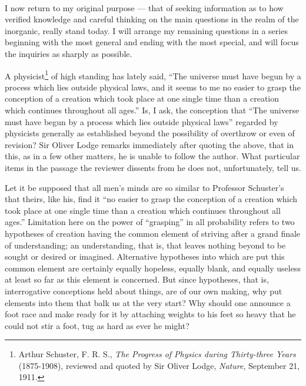 \documentclass[a4paper, 11pt, oneside, polutonikogreek, english]{article}
\begin{document}
\paragraph{}
I now return to my original purpose --- that of seeking information as to how verified knowledge and careful thinking on the main questions in the realm of the inorganic, really stand today. I will arrange my remaining questions in a series beginning with the most general and ending with the most special, and will focus the inquiries as sharply as possible.

A physicist\footnote{Arthur Schuster, F. R. S., \emph{The Progress of Physics during Thirty-three Years} (1875-1908), reviewed and quoted by Sir Oliver Lodge, \emph{Nature}, September 21, 1911.} of high standing has lately said, ``The universe must have begun by a process which lies outside physical laws, and it seems to me no easier to grasp the conception of a creation which took place at one single time than a creation which continues throughout all ages.'' Is, I ask, the conception that ``The universe must have begun by a process which lies outside physical laws'' regarded by physicists generally as established beyond the possibility of overthrow or even of revision? Sir Oliver Lodge remarks immediately after quoting the above, that in this, as in a few other matters, he is unable to follow the author. What particular items in the passage the reviewer dissents from he does not, unfortunately, tell us.

Let it be supposed that all men's minds are so similar to Professor Schuster's that theirs, like his, find it ``no easier to grasp the conception of a creation which took place at one single time than a creation which continues throughout all ages.'' Limitation here on the power of ``grasping'' in all probability refers to two hypotheses of creation having the common element of striving after a grand finale of understanding; an understanding, that is, that leaves nothing beyond to be sought or desired or imagined. Alternative hypotheses into which are put this common element are certainly equally hopeless, equally blank, and equally useless at least so far as this element is concerned. But since hypotheses, that is, interrogative conceptions held about things, are of our own making, why put elements into them that balk us at the very start? Why should one announce a foot race and make ready for it by attaching weights to his feet so heavy that he could not stir a foot, tug as hard as ever he might?
\end{document}
